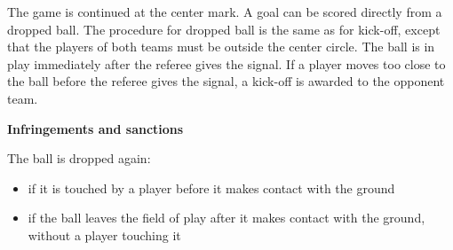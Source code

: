 \headlinebox

The game is continued at the center mark. A goal can be scored directly from a dropped ball. The procedure for dropped ball is the same as for kick-off, except that the players of both teams must be outside the center circle. The ball is in play immediately
after the referee gives the signal. If a player moves too close to the ball before the referee gives the signal, a kick-off
is awarded to the opponent team.



\bigskip

{\bfseries Infringements and sanctions}

\headlinebox

The ball is dropped again:

\begin{itemize}
\item if it is touched by a player before it makes contact with the ground 
\item if the ball leaves the field of play after it makes contact with the ground, without a player touching it
\end{itemize}

\bigskip

